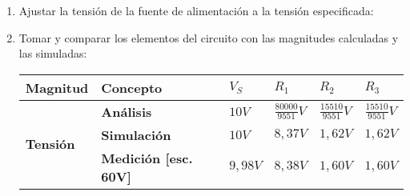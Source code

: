 \begin{enumerate}[resume]
    \item Ajustar la tensión de la fuente de alimentación a la tensión especificada: 
    \item Tomar y comparar los elementos del circuito con las magnitudes calculadas y las simuladas: \\[10pt]

        \begin{minipage}{\textwidth}
            \hspace{-1cm}
            \scriptsize
            \begin{tabular}{| p{1cm} p{1cm} p{1cm} p{1cm} p{1cm} p{1cm} |}
                \hline
                \multicolumn{1}{|m{1.4cm}}{\centering\textbf{Magnitud}} &
                \multicolumn{1}{m{1.4cm}}{\centering\textbf{Concepto}} &
                \multicolumn{1}{m{1cm}}{\centering\textbf{$V_S$}} &
                \multicolumn{1}{m{1cm}}{\centering\textbf{$R_1$}} &
                \multicolumn{1}{m{1cm}}{\centering\textbf{$R_2$}} &
                \multicolumn{1}{m{1cm}|}{\centering\textbf{$R_3$}} \\
                \hline
                \multicolumn{1}{|m{1.4cm}}{\multirow{3}{*}{\centering\textbf{Tensión}}} &
                \multicolumn{1}{m{1.4cm}}{\centering\textbf{Análisis}} &
                \multicolumn{1}{m{1cm}}{\centering$10V$} &
                \multicolumn{1}{m{1cm}}{\centering$\frac{80000}{9551}V$} &
                \multicolumn{1}{m{1cm}}{\centering$\frac{15510}{9551}V$} &
                \multicolumn{1}{m{1cm}|}{\centering$\frac{15510}{9551}V$} \\
                                                      &
                \multicolumn{1}{m{1.4cm}}{\textbf{Simulación}} &
                \multicolumn{1}{m{1cm}}{\centering$10V$} &
                \multicolumn{1}{m{1cm}}{\centering$8,37V$} &
                \multicolumn{1}{m{1cm}}{\centering$1,62V$} &
                \multicolumn{1}{m{1cm}|}{\centering$1,62V$} \\
                                                      &
                \multicolumn{1}{m{1.4cm}}{\centering\textbf{Medición [esc. 60V]}} &
                \multicolumn{1}{m{1cm}}{\centering$9,98V$} &
                \multicolumn{1}{m{1cm}}{\centering$8,38V$} &
                \multicolumn{1}{m{1cm}}{\centering$1,60V$} &
                \multicolumn{1}{m{1cm}|}{\centering$1,60V$} \\
                \hline

\end{tabular}
\end{minipage}
\end{enumerate}
